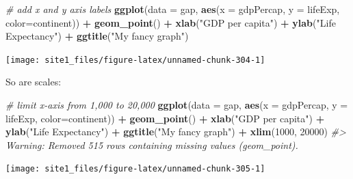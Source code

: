 \documentclass[]{book}
\newenvironment{Shaded}{\begin{snugshade}}{\end{snugshade}}
\newcommand{\CommentTok}[1]{\textcolor[rgb]{0.56,0.35,0.01}{\textit{#1}}}
\newcommand{\DataTypeTok}[1]{\textcolor[rgb]{0.13,0.29,0.53}{#1}}
\newcommand{\DecValTok}[1]{\textcolor[rgb]{0.00,0.00,0.81}{#1}}
\newcommand{\KeywordTok}[1]{\textcolor[rgb]{0.13,0.29,0.53}{\textbf{#1}}}
\newcommand{\NormalTok}[1]{#1}
\newcommand{\OperatorTok}[1]{\textcolor[rgb]{0.81,0.36,0.00}{\textbf{#1}}}
\newcommand{\StringTok}[1]{\textcolor[rgb]{0.31,0.60,0.02}{#1}}
\begin{document}
\begin{Shaded}
\begin{Highlighting}[]
\CommentTok{# add x and y axis labels}
\KeywordTok{ggplot}\NormalTok{(}\DataTypeTok{data =}\NormalTok{ gap, }\KeywordTok{aes}\NormalTok{(}\DataTypeTok{x =}\NormalTok{ gdpPercap, }\DataTypeTok{y =}\NormalTok{ lifeExp, }\DataTypeTok{color=}\NormalTok{continent)) }\OperatorTok{+}\StringTok{ }
\StringTok{  }\KeywordTok{geom_point}\NormalTok{() }\OperatorTok{+}\StringTok{ }
\StringTok{  }\KeywordTok{xlab}\NormalTok{(}\StringTok{"GDP per capita"}\NormalTok{) }\OperatorTok{+}\StringTok{ }
\StringTok{  }\KeywordTok{ylab}\NormalTok{(}\StringTok{"Life Expectancy"}\NormalTok{) }\OperatorTok{+}\StringTok{ }
\StringTok{  }\KeywordTok{ggtitle}\NormalTok{(}\StringTok{"My fancy graph"}\NormalTok{)}
\end{Highlighting}
\end{Shaded}

\begin{center}\texttt{[image: site1\_files/figure-latex/unnamed-chunk-304-1]} \end{center}

So are scales:

\begin{Shaded}
\begin{Highlighting}[]
\CommentTok{# limit x-axis from 1,000 to 20,000}
\KeywordTok{ggplot}\NormalTok{(}\DataTypeTok{data =}\NormalTok{ gap, }\KeywordTok{aes}\NormalTok{(}\DataTypeTok{x =}\NormalTok{ gdpPercap, }\DataTypeTok{y =}\NormalTok{ lifeExp, }\DataTypeTok{color=}\NormalTok{continent)) }\OperatorTok{+}\StringTok{ }
\StringTok{  }\KeywordTok{geom_point}\NormalTok{() }\OperatorTok{+}\StringTok{ }
\StringTok{  }\KeywordTok{xlab}\NormalTok{(}\StringTok{"GDP per capita"}\NormalTok{) }\OperatorTok{+}\StringTok{ }
\StringTok{  }\KeywordTok{ylab}\NormalTok{(}\StringTok{"Life Expectancy"}\NormalTok{) }\OperatorTok{+}\StringTok{ }
\StringTok{  }\KeywordTok{ggtitle}\NormalTok{(}\StringTok{"My fancy graph"}\NormalTok{) }\OperatorTok{+}\StringTok{ }
\StringTok{  }\KeywordTok{xlim}\NormalTok{(}\DecValTok{1000}\NormalTok{, }\DecValTok{20000}\NormalTok{)}
\CommentTok{#> Warning: Removed 515 rows containing missing values (geom_point).}
\end{Highlighting}
\end{Shaded}

\begin{center}\texttt{[image: site1\_files/figure-latex/unnamed-chunk-305-1]} \end{center}
\end{document}
